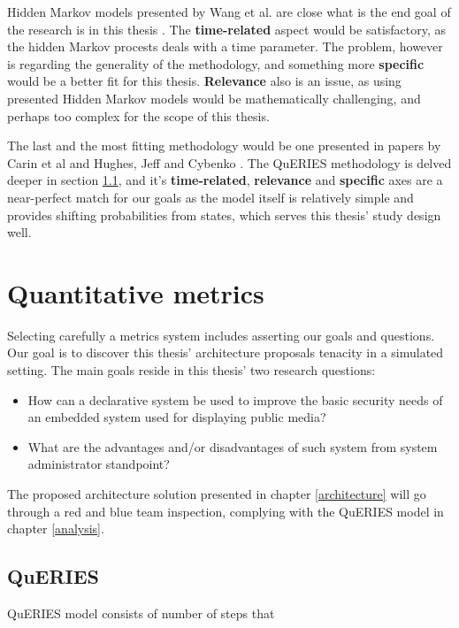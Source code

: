 Hidden Markov models presented by Wang et al. are close what is the
end goal of the research is in this thesis
\cite{wang2010framework}. The \textbf{time-related} aspect would be
satisfactory, as the hidden Markov procests deals with a time
parameter. The problem, however is regarding the generality of the
methodology, and something more \textbf{specific} would be a better
fit for this thesis. \textbf{Relevance} also is an issue, as using
presented Hidden Markov models would be mathematically challenging,
and perhaps too complex for the scope of this thesis.

The last and the most fitting methodology would be one presented in
papers by Carin et al and Hughes, Jeff and Cybenko
\cite{carin2008cybersecurity hughes2013quantitative}. The
QuERIES methodology is delved deeper in section \ref{queries}, and
it's \textbf{time-related}, \textbf{relevance} and \textbf{specific}
axes are a near-perfect match for our goals as the model itself is
relatively simple and provides shifting probabilities from states,
which serves this thesis' study design well.

\section{Quantitative metrics} \label{quantitativemetrics}

Selecting carefully a metrics system includes asserting our goals and
questions. Our goal is to discover this thesis' architecture proposals
tenacity in a simulated setting. The main goals reside in this thesis'
two research questions:
\begin{itemize}
\item How can a declarative system be used to improve the basic
  security needs of an embedded system used for displaying public
  media?
\item What are the advantages and/or disadvantages of such system from
  system administrator standpoint?
\end{itemize}

The proposed architecture solution presented in chapter
\ref{architecture} will go through a red and blue team inspection,
complying with the QuERIES model in chapter \ref{analysis}.

\subsection{QuERIES} \label{queries}
QuERIES model consists of number of steps that

